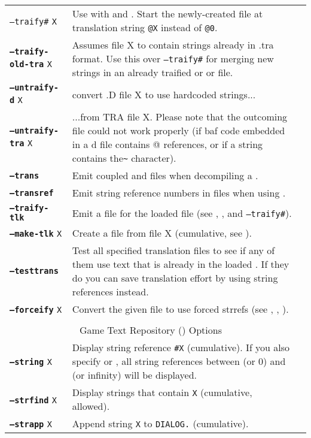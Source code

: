 \documentclass{article}
\def\ttref#1{\ahrefloc{#1}{\tt #1}}
\def\DEFINE#1{{\tt \bf #1}\label{#1}\index{#1}}
\def\t#1{{\tt #1}}
\begin{document}
\begin{tabular}{lp{10in}|p{10in}}
\t{--traify\#} \t{X} &	Use with \ttref{--traify} and \ttref{--traify-tlk}. Start the newly-created \ttref{TRA} file at translation string {\tt @X} instead of {\tt @0}. \\
\DEFINE{--traify-old-tra} \t{X} & Assumes file X to contain strings already in .tra format.
Use this over \t{--traify\#} for merging new strings in an already traified \ttref{D} or \ttref{TP2} or \ttref{BAF} file.
\\
\DEFINE{--untraify-d} \t{X} & convert .D file X to use hardcoded strings... \\
\DEFINE{--untraify-tra} \t{X} & ...from TRA file X. Please note that the outcoming file
  could not work properly (if baf code embedded in a d file contains @ references, or if a string contains
  the\verb+~+ character). \\
\DEFINE{--trans} & Emit coupled \ttref{D} and \ttref{TRA} files when
  decompiling a \ttref{DLG}.  \\
\DEFINE{--transref} &	Emit string reference numbers in \ttref{TRA} files
when using \ttref{--trans}. \\
\DEFINE{--traify-tlk} & Emit a \ttref{TRA} file for the loaded \ttref{TLK} file (see \ttref{--tlkin}, \ttref{--out}, \ttref{--min} and \t{--traify\#}). \\
\DEFINE{--make-tlk} \t{X} & Create a \ttref{TLK} file from \ttref{TRA} file X (cumulative, see \ttref{--tlkout}). \\
\DEFINE{--testtrans} &	Test all specified \ttref{TRA} translation files to
see if any of them use text that is already in the loaded
\ttref{DIALOG.TLK}. If they do you can save translation effort by using
string references instead. \\
\DEFINE{--forceify} \t{X} & Convert the given \ttref{D} file to use forced
strrefs (see \ttref{--out}, \ttref{SAY}, \ttref{Forced String Reference}). \\
\\
\multicolumn{2}{c}{ \color{red} Game Text Repository (\ttref{TLK}) Options} \\
\DEFINE{--string} \t{X}&	Display string reference {\tt \#X} (cumulative). If you also specify \ttref{--min} or \ttref{--max}, all string references between \ttref{--min} (or 0) and \ttref{--max} (or infinity) will be displayed. \\
\DEFINE{--strfind} \t{X}&	Display strings that contain {\tt X} (cumulative, \ttref{regexp} allowed). \\
\DEFINE{--strapp} \t{X}&	Append string \t{X} to \t{DIALOG.}\ttref{TLK} (cumulative). \\

\end{tabular}
\end{document}

